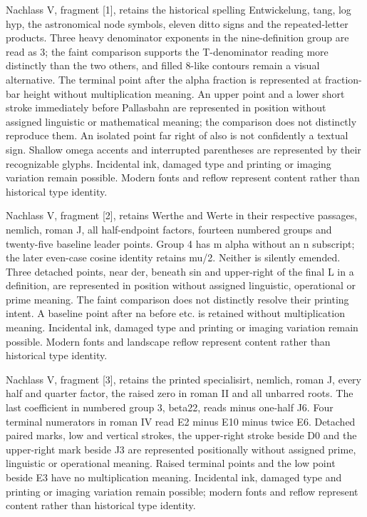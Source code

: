 Nachlass V, fragment [1], retains the historical spelling Entwickelung, tang, log hyp, the astronomical node symbols, eleven ditto signs and the repeated-letter products. Three heavy denominator exponents in the nine-definition group are read as 3; the faint comparison supports the T-denominator reading more distinctly than the two others, and filled 8-like contours remain a visual alternative. The terminal point after the alpha fraction is represented at fraction-bar height without multiplication meaning. An upper point and a lower short stroke immediately before Pallasbahn are represented in position without assigned linguistic or mathematical meaning; the comparison does not distinctly reproduce them. An isolated point far right of also is not confidently a textual sign. Shallow omega accents and interrupted parentheses are represented by their recognizable glyphs. Incidental ink, damaged type and printing or imaging variation remain possible. Modern fonts and reflow represent content rather than historical type identity.

Nachlass V, fragment [2], retains Werthe and Werte in their respective passages, nemlich, roman J, all half-endpoint factors, fourteen numbered groups and twenty-five baseline leader points. Group 4 has m alpha without an n subscript; the later even-case cosine identity retains mu/2. Neither is silently emended. Three detached points, near der, beneath sin and upper-right of the final L in a definition, are represented in position without assigned linguistic, operational or prime meaning. The faint comparison does not distinctly resolve their printing intent. A baseline point after na before etc. is retained without multiplication meaning. Incidental ink, damaged type and printing or imaging variation remain possible. Modern fonts and landscape reflow represent content rather than historical type identity.

Nachlass V, fragment [3], retains the printed specialisirt, nemlich, roman J, every half and quarter factor, the raised zero in roman II and all unbarred roots. The last coefficient in numbered group 3, beta22, reads minus one-half J6. Four terminal numerators in roman IV read E2 minus E10 minus twice E6. Detached paired marks, low and vertical strokes, the upper-right stroke beside D0 and the upper-right mark beside J3 are represented positionally without assigned prime, linguistic or operational meaning. Raised terminal points and the low point beside E3 have no multiplication meaning. Incidental ink, damaged type and printing or imaging variation remain possible; modern fonts and reflow represent content rather than historical type identity.

